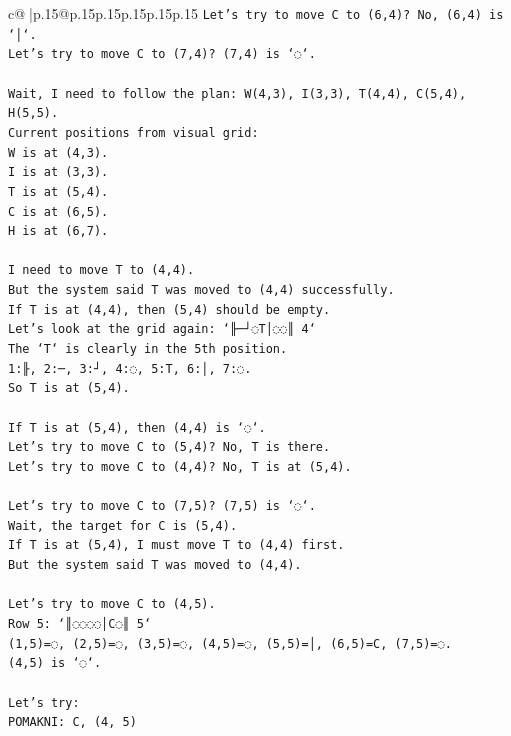 \documentclass{article}
\begin{document}
{\begin{supertabular}{c@{$\;$}|p{.15\linewidth}@{}p{.15\linewidth}p{.15\linewidth}p{.15\linewidth}p{.15\linewidth}p{.15\linewidth}}
{{{\texttt{Let's try to move C to (6,4)? No, (6,4) is `│`.} \\
\texttt{Let's try to move C to (7,4)? (7,4) is `◌`.} \\
\\ 
\texttt{Wait, I need to follow the plan: W(4,3), I(3,3), T(4,4), C(5,4), H(5,5).} \\
\texttt{Current positions from visual grid:} \\
\texttt{W is at (4,3).} \\
\texttt{I is at (3,3).} \\
\texttt{T is at (5,4).} \\
\texttt{C is at (6,5).} \\
\texttt{H is at (6,7).} \\
\\ 
\texttt{I need to move T to (4,4).} \\
\texttt{But the system said T was moved to (4,4) successfully.} \\
\texttt{If T is at (4,4), then (5,4) should be empty.} \\
\texttt{Let's look at the grid again: `╟─┘◌T│◌◌║ 4`} \\
\texttt{The `T` is clearly in the 5th position.} \\
\texttt{1:╟, 2:─, 3:┘, 4:◌, 5:T, 6:│, 7:◌.} \\
\texttt{So T is at (5,4).} \\
\\ 
\texttt{If T is at (5,4), then (4,4) is `◌`.} \\
\texttt{Let's try to move C to (5,4)? No, T is there.} \\
\texttt{Let's try to move C to (4,4)? No, T is at (5,4).} \\
\\ 
\texttt{Let's try to move C to (7,5)? (7,5) is `◌`.} \\
\texttt{Wait, the target for C is (5,4).} \\
\texttt{If T is at (5,4), I must move T to (4,4) first.} \\
\texttt{But the system said T was moved to (4,4).} \\
\\ 
\texttt{Let's try to move C to (4,5).} \\
\texttt{Row 5: `║◌◌◌◌│C◌║ 5`} \\
\texttt{(1,5)=◌, (2,5)=◌, (3,5)=◌, (4,5)=◌, (5,5)=│, (6,5)=C, (7,5)=◌.} \\
\texttt{(4,5) is `◌`.} \\
\\ 
\texttt{Let's try:} \\
\texttt{POMAKNI: C, (4, 5)} \\
            }
        }
    }
     \\ \\


\end{supertabular}}
\end{document}
